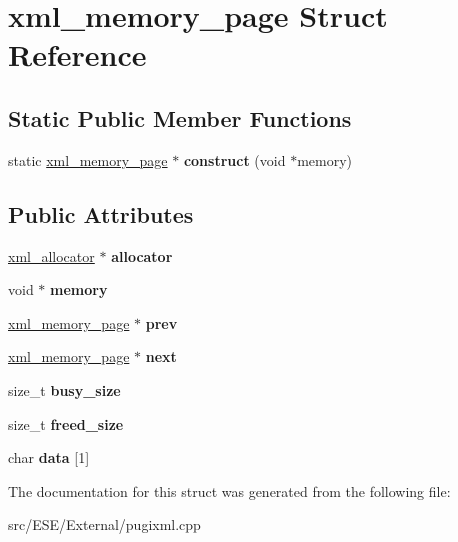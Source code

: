\hypertarget{structxml__memory__page}{\section{xml\-\_\-memory\-\_\-page Struct Reference}
\label{structxml__memory__page}
}
\subsection*{Static Public Member Functions}
\begin{DoxyCompactItemize}
\item 
\hypertarget{structxml__memory__page_ab425973f2abb4fa98ff077d88c0df11c}{static \hyperlink{structxml__memory__page}{xml\-\_\-memory\-\_\-page} $\ast$ {\bfseries construct} (void $\ast$memory)}\label{structxml__memory__page_ab425973f2abb4fa98ff077d88c0df11c}

\end{DoxyCompactItemize}
\subsection*{Public Attributes}
\begin{DoxyCompactItemize}
\item 
\hypertarget{structxml__memory__page_adf8fa143123a842baa59b82fc3d83c3b}{\hyperlink{structxml__allocator}{xml\-\_\-allocator} $\ast$ {\bfseries allocator}}\label{structxml__memory__page_adf8fa143123a842baa59b82fc3d83c3b}

\item 
\hypertarget{structxml__memory__page_ab51315db80e7f2a5afb87c56fedcd734}{void $\ast$ {\bfseries memory}}\label{structxml__memory__page_ab51315db80e7f2a5afb87c56fedcd734}

\item 
\hypertarget{structxml__memory__page_a014969b0e4a34a6cb24e9823791e60ab}{\hyperlink{structxml__memory__page}{xml\-\_\-memory\-\_\-page} $\ast$ {\bfseries prev}}\label{structxml__memory__page_a014969b0e4a34a6cb24e9823791e60ab}

\item 
\hypertarget{structxml__memory__page_a326a74e009af80219ea31bc65ed9e45e}{\hyperlink{structxml__memory__page}{xml\-\_\-memory\-\_\-page} $\ast$ {\bfseries next}}\label{structxml__memory__page_a326a74e009af80219ea31bc65ed9e45e}

\item 
\hypertarget{structxml__memory__page_a04780ddabc14b45baba3d1ded79d355a}{size\-\_\-t {\bfseries busy\-\_\-size}}\label{structxml__memory__page_a04780ddabc14b45baba3d1ded79d355a}

\item 
\hypertarget{structxml__memory__page_ab4c29645546530a0e1938b53979890a8}{size\-\_\-t {\bfseries freed\-\_\-size}}\label{structxml__memory__page_ab4c29645546530a0e1938b53979890a8}

\item 
\hypertarget{structxml__memory__page_abd99ed1563aa66fb3573a9208452685c}{char {\bfseries data} \mbox{[}1\mbox{]}}\label{structxml__memory__page_abd99ed1563aa66fb3573a9208452685c}

\end{DoxyCompactItemize}


The documentation for this struct was generated from the following file\-:\begin{DoxyCompactItemize}
\item 
src/\-E\-S\-E/\-External/pugixml.\-cpp\end{DoxyCompactItemize}

